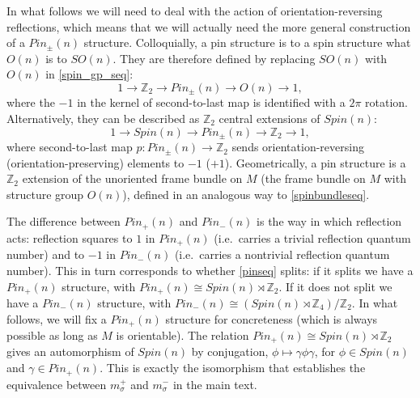 \documentclass[12pt,a4paper]{article}
\newcounter{arrow}
\newcommand{\ra}{\rightarrow}
\newcommand{\zz}{\mathbb{Z}}
\newcommand{\zt}{\mathbb{Z}_2}
\newcommand\be            {\begin{equation}}
\newcommand\ee            {\end{equation}}
\newcommand{\ethan}[1]{{\color{amethyst}\footnotesize{(EL) #1}}}
\begin{document}
In what follows we will need to deal with the action of orientation-reversing reflections, which means that we will actually need the more general construction of a $Pin_\pm(n)$ structure. Colloquially, a pin structure is to a spin structure what $O(n)$ is to $SO(n)$. They are therefore defined by replacing $SO(n)$ with $O(n)$ in \eqref{spin_gp_seq}:
\be \label{pin_gp_seq} 1 \ra \zt \ra Pin_\pm(n) \ra O(n) \ra 1,\ee
where the $-1$ in the kernel of second-to-last map is identified with a $2\pi$ rotation.
Alternatively, they can be described as $\zt$ central extensions of $Spin(n)$:
\be \label{pinseq} 1\ra Spin(n) \ra Pin_\pm(n) \ra \zt \ra 1,\ee 
where second-to-last map $p : Pin_\pm(n) \ra \zt$ sends orientation-reversing (orientation-preserving) elements to $-1$ ($+1$). Geometrically, a pin structure is a $\zt$ extension of the unoriented frame bundle on $M$ (the frame bundle on $M$ with structure group $O(n)$), defined in an analogous way to \eqref{spinbundleseq}.

The difference between $Pin_+(n)$ and $Pin_-(n)$ is the way in which reflection acts: 
reflection squares to $1$ in $Pin_+(n)$ (i.e.\ carries a trivial reflection quantum number) 
and to $-1$ in $Pin_-(n)$ (i.e.\ carries a nontrivial reflection quantum number). 
This in turn corresponds to whether \eqref{pinseq} splits: if it splits we have a $Pin_+(n)$ structure, 
with $Pin_+(n) \cong Spin(n) \rtimes \zt$. If it does not split we have a $Pin_-(n)$ structure, 
with $Pin_-(n) \cong (Spin(n) \rtimes \zz_4)/\zt$. In what follows, we will fix a $Pin_+(n)$ 
structure for concreteness (which is always possible as long as $M$ is orientable). 
The relation $Pin_+(n) \cong Spin(n) \rtimes \zt$ gives an automorphism of $Spin(n)$ by 
conjugation, $\phi \mapsto \gamma \phi \gamma$, for $\phi \in Spin(n)$ and $\gamma \in Pin_+(n)$. 
This is exactly the isomorphism that establishes the equivalence between $m_\sigma^+$ 
and $m_\sigma^-$ in the main text. 

\end{document}
